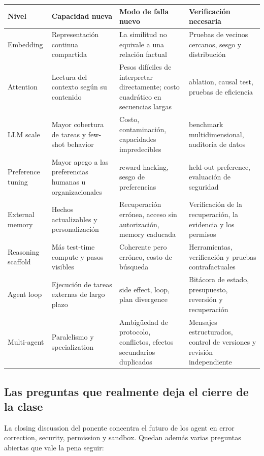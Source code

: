 \documentclass[a4paper]{article}
\begin{document}
\begin{center}
\begin{longtable}{L{0.17\textwidth} L{0.22\textwidth} L{0.24\textwidth} L{0.25\textwidth}}
\toprule
Nivel & Capacidad nueva & Modo de falla nuevo & Verificación necesaria \\
\midrule
\endhead
Embedding & Representación continua compartida & La similitud no equivale a una relación factual & Pruebas de vecinos cercanos, sesgo y distribución \\
Attention & Lectura del contexto según su contenido & Pesos difíciles de interpretar directamente; costo cuadrático en secuencias largas & ablation, causal test, pruebas de eficiencia \\
LLM scale & Mayor cobertura de tareas y few-shot behavior & Costo, contaminación, capacidades impredecibles & benchmark multidimensional, auditoría de datos \\
Preference tuning & Mayor apego a las preferencias humanas u organizacionales & reward hacking, sesgo de preferencias & held-out preference, evaluación de seguridad \\
External memory & Hechos actualizables y personalización & Recuperación errónea, acceso sin autorización, memory caducada & Verificación de la recuperación, la evidencia y los permisos \\
Reasoning scaffold & Más test-time compute y pasos visibles & Coherente pero erróneo, costo de búsqueda & Herramientas, verificación y pruebas contrafactuales \\
Agent loop & Ejecución de tareas externas de largo plazo & side effect, loop, plan divergence & Bitácora de estado, presupuesto, reversión y recuperación \\
Multi-agent & Paralelismo y specialization & Ambigüedad de protocolo, conflictos, efectos secundarios duplicados & Mensajes estructurados, control de versiones y revisión independiente \\
\bottomrule
\end{longtable}
\end{center}

\subsection{Las preguntas que realmente deja el cierre de la clase}

La closing discussion del ponente concentra el futuro de los agent en error correction, security, permission y sandbox. Quedan además varias preguntas abiertas que vale la pena seguir:
\end{document}
